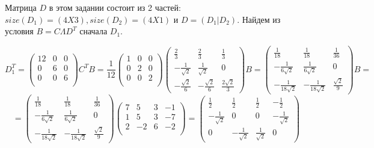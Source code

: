 \documentclass[a4paper,12pt]{article}
\newcounter{z}
\begin{document}
\begin{enumerate}
Матрица $D$ в этом задании состоит из 2 частей: $size(D_1)=(4X3), size(D_2)=(4X1)$ и $D = (D_1|D_2)$.
Найдем из условия $B = C \Lambda D^T$ сначала $D_1$.

$$D_1^T=\begin{pmatrix}
12&0&0\\
0&6&0\\
0&0&6\\
\end{pmatrix} C^T B=\frac{1}{12}\begin{pmatrix}
1&0&0\\
0&2&0\\
0&0&2\\
\end{pmatrix} \begin{pmatrix}
\frac{2}{3}&\frac{2}{3}&\frac{1}{3}\\
-\frac{1}{\sqrt{2}}&\frac{1}{\sqrt{2}}&0\\
-\frac{\sqrt{2}}{6}&-\frac{\sqrt{2}}{6}&\frac{2\sqrt{2}}{3}
\end{pmatrix} B=\begin{pmatrix}
\frac{1}{18}&\frac{1}{18}&\frac{1}{36}\\
-\frac{1}{6\sqrt{2}}&\frac{1}{6\sqrt{2}}&0\\
-\frac{1}{18\sqrt{2}}&-\frac{1}{18\sqrt{2}}&\frac{\sqrt{2}}{9}
\end{pmatrix} B=$$
$$=\begin{pmatrix}
\frac{1}{18}&\frac{1}{18}&\frac{1}{36}\\
-\frac{1}{6\sqrt{2}}&\frac{1}{6\sqrt{2}}&0\\
-\frac{1}{18\sqrt{2}}&-\frac{1}{18\sqrt{2}}&\frac{\sqrt{2}}{9}
\end{pmatrix} \begin{pmatrix}
7&5&3&-1\\
1&5&3&-7\\
2&-2&6&-2\\
\end{pmatrix}=\begin{pmatrix}
\frac{1}{2}&\frac{1}{2}&\frac{1}{2}&-\frac{1}{2}\\
-\frac{1}{\sqrt{2}}&0&0&-\frac{1}{\sqrt{2}}\\
0&-\frac{1}{\sqrt{2}}&\frac{1}{\sqrt{2}}&0
\end{pmatrix}$$


\end{enumerate}
\end{document}
